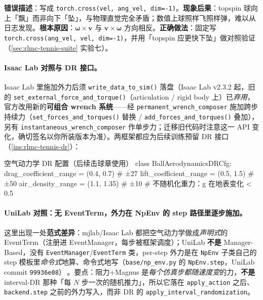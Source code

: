 \begin{pitfall}
\textbf{错误描述}：写成 \verb|torch.cross(vel, ang_vel, dim=-1)|。\textbf{现象后果}：topspin 球向上「飘」而非向下「坠」，与物理直觉完全矛盾；数值上球照样飞照样弹，难以从日志发现。\textbf{根本原因}：$\boldsymbol\omega\times\mathbf v$ 与 $\mathbf v\times\boldsymbol\omega$ 方向相反。\textbf{正确做法}：固定写 \verb|torch.cross(ang_vel, vel, dim=-1)|，并用「topspin 应更快下坠」做对照验证（\cref{sec:rlmc-tennis-suite} 实验七）。
\end{pitfall}

\paragraph{Isaac Lab 对照与 DR 接口。}Isaac Lab 里施加外力后须 \verb|write_data_to_sim()| 落盘（Isaac Lab v2.3.2 起，旧的 \texttt{set\_external\_force\_and\_torque()}（articulation / rigid body 上）已\emph{弃用}，官方改用新的\textbf{可组合 wrench 系统}——经 \texttt{permanent\_wrench\_composer} 施加跨步持续力（\texttt{set\_forces\_and\_torques()} 替换 / \texttt{add\_forces\_and\_torques()} 叠加），另有 \texttt{instantaneous\_wrench\_composer} 作单步力；迁移旧代码时注意这一 API 变化，确切签名以你所装版本为准）。两框架都应为后续训练预留 DR 接口（\cref{ins:rlmc-tennis-dr}）：

\begin{codebox}[Python]{空气动力学 DR 配置（后续击球章使用）}
class BallAerodynamicsDRCfg:
    drag_coefficient_range = (0.4, 0.7)   # ±27%
    lift_coefficient_range = (0.5, 1.5)   # ±50%
    air_density_range      = (1.1, 1.35)  # ±10%
    # 不随机化重力：g 在地表变化 < 0.5%
\end{codebox}

\paragraph{UniLab 对照：无 EventTerm，外力在 NpEnv 的 step 路径里逐步施加。}这里出现一处\textbf{范式差异}：mjlab/Isaac Lab 都把空气动力学做成\emph{声明式}的 EventTerm（注册进 EventManager，每步被框架调度）；UniLab \textbf{不是} Manager-Based，没有 \verb|EventManager|/\verb|EventTerm| 类，per-step 外力是在 \verb|NpEnv| 子类自己的 step 模板里\emph{命令式}地算、命令式地写（\verb|base/np_env.py| 的 \verb|NpEnv.step|，UniLab commit \texttt{99936e08}）\,\cite{unilab2026}。要点：阻力$+$Magnus 是\emph{每个仿真步都随速度变}的力，\textbf{不是} interval-DR 那种「每 $N$ 步一次的随机推力」，所以它落在 \verb|apply_action| 之后、\verb|backend.step| 之前的外力写入，而非 DR 的 \verb|apply_interval_randomization|。

